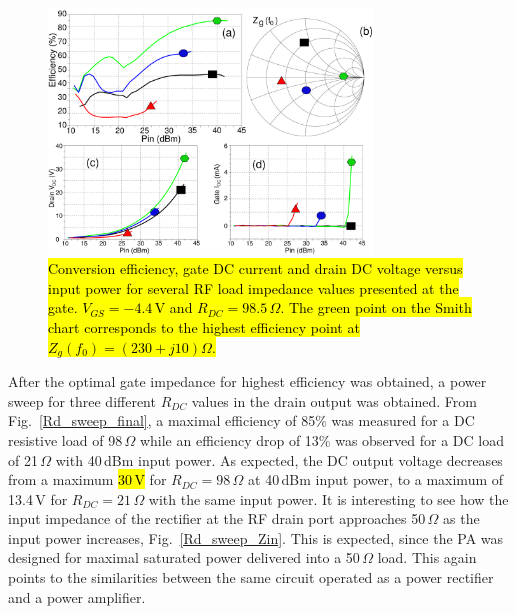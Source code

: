 \documentclass[journal]{IEEEtran}
\begin{document}
\begin{figure}[ht!]
\centering
\includegraphics[width=3.4in]{pdf/12.pdf}
\caption{\hl{Conversion efficiency, gate DC current and drain DC voltage versus input power for several RF load impedance values presented at the gate. $V_{GS}=-4.4$\,V and $R_{DC}=98.5$\,$\Omega$. The green point on the Smith chart corresponds to the highest efficiency point at $Z_g(f_0)=\left(230+j10\right)\Omega$. }}
\label{MEAS_LP_sweep}
\end{figure}







After the optimal gate impedance for highest efficiency was obtained, a power sweep for three different $R_{DC}$ values in the drain output was obtained. From Fig.~\ref{Rd_sweep_final}, a maximal efficiency of 85\% was measured for a DC resistive load of 98\,$\Omega$ while an efficiency drop of 13\% was observed for a DC load of 21\,$\Omega$ with 40\,dBm input power. As expected, the DC output voltage decreases from a maximum \hl{30\,V} for $R_{DC}=98$\,$\Omega$ at 40\,dBm input power, to a maximum of 13.4\,V for $R_{DC}=21$\,$\Omega$ with the same input power. It is interesting to see how the input impedance of the rectifier at the RF drain port approaches 50\,$\Omega$ as the input power increases, Fig.~\ref{Rd_sweep_Zin}. This is expected, since the PA was designed for maximal saturated power delivered into a 50\,$\Omega$ load. This again points to the similarities between the same circuit operated as a power rectifier and a power amplifier.
\end{document}
